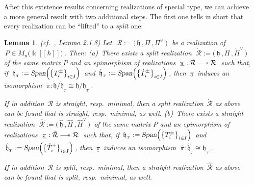 \documentclass[12pt,reqno,twoside,a4paper]{amsart}
\numberwithin{equation}{section}
\newtheorem{lema}{Lemma}[subsection]
\theoremstyle{definition}
\newtheorem{free text}[lema]{}
\theoremstyle{remark}
\newcommand{\R}{{\mathcal R}}
\def \kh{{\Bbbk[[\hbar]]}}
\def \lieh{\mathfrak{h}}
\theoremstyle{plain}
\begin{document}
\vskip7pt

   After this existence results concerning realizations of special type, we can achieve a more general result with two additional steps.  The first one tells in short that every realization can be ``lifted'' to a \textsl{split\/}  one:

\vskip9pt

\begin{lema}  \label{lemma: split/straight-lifting}  \textsl{(cf.\ \cite{GG3}, Lemma 2.1.8)}
%
 \vskip3pt
%
 Let  $ \; \R := \big(\, \lieh \, , \Pi \, , \Pi^\vee \,\big) \; $  be a realization of  $ \, P \in M_n\big(\kh\big) \, $.  Then:
%
 \vskip3pt
%
   \textit{(a)}\,  There exists a  \textsl{split}  realization  $ \; \dot{\R} := \big(\, \dot{\lieh} \, , \dot{\Pi} \, , {\dot{\Pi}}^\vee \,\big) \, $   of the same matrix  $ P $  and an epimorphism of realizations  $ \; \underline{\pi} : \dot{\R} \relbar\joinrel\twoheadrightarrow \R \; $  such that, if  $ \, \lieh_{{}_T} := \textsl{Span}\Big( {\big\{ T_i^\pm \big\}}_{i \in I} \Big) \, $  and  $ \, \dot{\lieh}_{{}_T} := \textsl{Span}\Big( {\big\{ \dot{T}_i^\pm \big\}}_{i \in I} \Big) \, $,  then  $ \, \underline{\pi} \, $  induces an isomorphism  $ \; \dot{\pi} : \dot{\lieh} \Big/ \dot{\lieh}_{{}_T} \cong \lieh \Big/ \lieh_{{}_T} \; $.
                                                               \par
   If in addition  $ \, \R $  is  \textsl{straight},  resp.\ \textsl{minimal},  then a  \textsl{split}  realization  $ \, \dot{\R} $
   as above can be found that is  \textsl{straight},  resp.\ \textsl{minimal},  as well.
%
 \vskip3pt
%
   \textit{(b)}\,  There exists a  \textsl{straight}  realization  $ \; \hat{\R} := \big(\, \hat{\lieh} \, , \hat{\Pi} \, , {\hat{\Pi}}^\vee \,\big) \, $   of the same matrix  $ P $  and an epimorphism of realizations  $ \; \underline{\pi} : \hat{\R} \relbar\joinrel\twoheadrightarrow \R \; $  such that, if  $ \, \lieh_{{}_T} := \textsl{Span}\Big( {\big\{ T_i^\pm \big\}}_{i \in I} \Big) \, $  and  $ \, \hat{\lieh}_{{}_T} := \textsl{Span}\Big( {\big\{ \hat{T}_i^\pm \big\}}_{i \in I} \Big) \, $,  then  $ \, \underline{\pi} \, $  induces an isomorphism  $ \; \hat{\pi} : \hat{\lieh}_{{}_T} \cong \lieh_{{}_T} \; $.
                                                               \par
   If in addition  $ \, \R $  is  \textsl{split},  resp.\ \textsl{minimal},  then a  \textsl{straight}  realization  $ \, \hat{\R} $
   as above can be found that is  \textsl{split},  resp.\ \textsl{minimal},  as well.
%
\end{lema}
\end{document}
